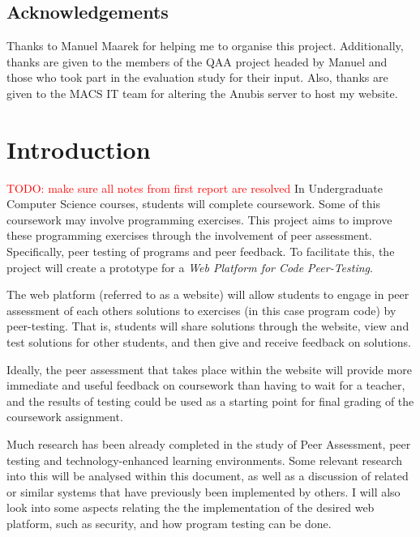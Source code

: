 \documentclass[a4paper,11pt]{report}
\newcommand{\todo}[1]{\textcolor{red}{TODO: #1}}
\begin{document}
\newpage

\section*{Acknowledgements}
Thanks to Manuel Maarek for helping me to organise this project. Additionally, thanks are given to the members of the QAA project headed by Manuel and those who took part in the evaluation study for their input. Also, thanks are given to the MACS IT team for altering the Anubis server to host my website.

\newpage

\pagestyle{headings}



\chapter{Introduction}
\todo{make sure all notes from first report are resolved}
In Undergraduate Computer Science courses, students will complete coursework. Some of this coursework may involve programming exercises. This project aims to improve these programming exercises through the involvement of peer assessment. Specifically, peer testing of programs and peer feedback. To facilitate this, the project will create a prototype for a \textit{Web Platform for Code Peer-Testing}.\par
The web platform (referred to as a website) will allow students to engage in peer assessment of each others solutions to exercises (in this case program code) by peer-testing. That is, students will share solutions through the website, view and test solutions for other students, and then give and receive feedback on solutions.\par
Ideally, the peer assessment that takes place within the website will provide more immediate and useful feedback on coursework than having to wait for a teacher, and the results of testing could be used as a starting point for final grading of the coursework assignment.\par

Much research has been already completed in the study of Peer Assessment, peer testing and technology-enhanced learning environments. Some relevant research into this will be analysed within this document, as well as a discussion of related or similar systems that have previously been implemented by others. I will also look into some aspects relating the the implementation of the desired web platform, such as security, and how program testing can be done.\par
\end{document}
